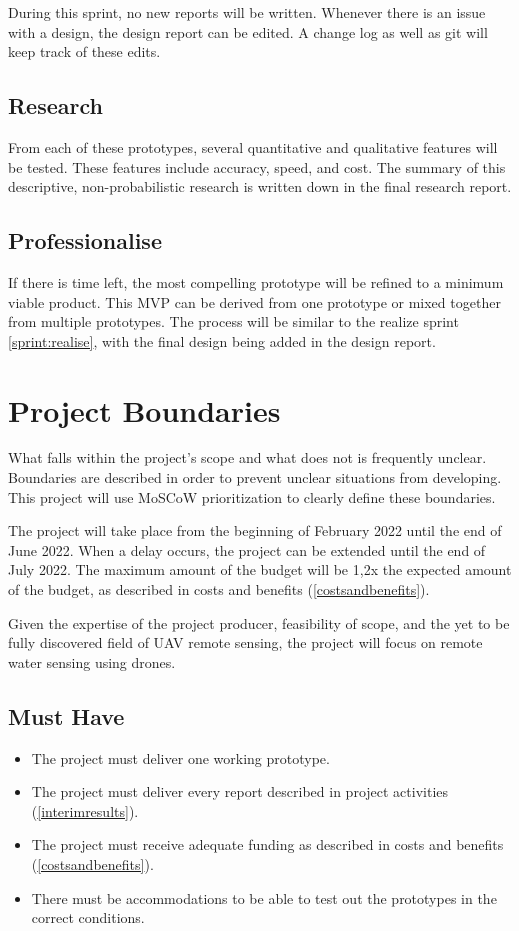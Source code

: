 \documentclass[11pt, a4paper]{article}
\begin{document}
During this sprint, no new reports will be written. Whenever there is an issue with a design, the design report can be edited. A change log as well as git will keep track of these edits.

\subsection{Research} \label{sprint:research}
From each of these prototypes, several quantitative and qualitative features will be tested. These features include accuracy, speed, and cost. The summary of this descriptive, non-probabilistic research is written down in the final research report.

\subsection{Professionalise} \label{sprint:professionalise}
If there is time left, the most compelling prototype will be refined to a minimum viable product. \cite{mvp} This MVP can be derived from one prototype or mixed together from multiple prototypes. The process will be similar to the realize sprint \ref{sprint:realise}, with the final design being added in the design report.

\section{Project Boundaries} \label{projectboundaries}
What falls within the project’s scope and what does not is frequently  unclear. Boundaries are described in order to prevent unclear situations from developing. This project will use MoSCoW prioritization to clearly define these boundaries. \cite{moscow}

The project will take place from the beginning of February 2022 until the end of June 2022. When a delay occurs, the project can be extended until the end of July 2022. The maximum amount of the budget will be 1,2x the expected amount of the budget, as described in costs and benefits (\ref{costsandbenefits}). 

Given the expertise of the project producer, feasibility of scope, and the yet to be fully discovered field of UAV remote sensing, the project will focus on remote water sensing using drones.

\subsection{Must Have}
\begin{itemize}
  \item The project must deliver one working prototype.
  \item The project must deliver every report described in project activities (\ref{interimresults}).
  \item The project must receive adequate funding as described in costs and benefits (\ref{costsandbenefits}).
  \item There must be accommodations to be able to test out the prototypes in the correct conditions.
\end{itemize}
\end{document}
